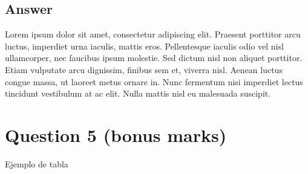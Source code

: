 \documentclass[
	12pt, %
	spanish, %
]{fphw}
\begin{document}
\subsection*{Answer}
Lorem ipsum dolor sit amet, consectetur adipiscing elit. Praesent porttitor arcu luctus, imperdiet urna iaculis, mattis eros. Pellentesque iaculis odio vel nisl ullamcorper, nec faucibus ipsum molestie. Sed dictum nisl non aliquet porttitor. Etiam vulputate arcu dignissim, finibus sem et, viverra nisl. Aenean luctus congue massa, ut laoreet metus ornare in. Nunc fermentum nisi imperdiet lectus tincidunt vestibulum at ac elit. Nulla mattis nisl eu malesuada suscipit.


\section*{Question 5 (bonus marks)}
Ejemplo de tabla 
%	
%
%	
%
\end{document}
